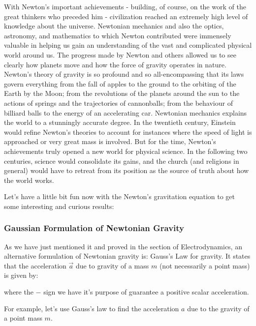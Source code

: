 	With Newton’s important achievements - building, of course, on the work of the great thinkers who preceded him - civilization reached an extremely high level of knowledge about the universe. Newtonian mechanics and also the optics, astronomy, and mathematics to which Newton contributed were immensely valuable in helping us gain an understanding of the vast and complicated physical world around us. The progress made by Newton and others allowed us to see clearly how planets move and how the force of gravity operates in nature. Newton’s theory of gravity is so profound and so all-encompassing that its laws govern everything from the fall of apples to the ground to the orbiting of the Earth by the Moon; from the revolutions of the planets around the sun to the actions of springs and the trajectories of cannonballs; from the behaviour of billiard balls to the energy of an accelerating car. Newtonian mechanics explains the world to a stunningly accurate degree. In the twentieth century, Einstein would refine Newton’s theories to account for instances where the speed of light is approached or very great mass is involved. But for the time, Newton’s achievements truly opened a new world for physical science. In the following two centuries, science would consolidate its gains, and the church (and religions in general) would have to retreat from its position as the source of truth about how the world works.
	
	Let's have a little bit fun now with the Newton's gravitation equation to get some interesting and curious results:
	
	\subsubsection{Gaussian Formulation of Newtonian Gravity}
	As we have just mentioned it and proved in the section of Electrodynamics, an alternative formulation of Newtonian gravity is: Gauss’s Law for gravity. It states that the acceleration $\vec{a}$ due to gravity of a mass $m$ (not necessarily a point mass) is given by:
	
	where the $-$ sign we have it's purpose of guarantee a positive scalar acceleration.
	
	For example, let's use Gauss's law to find the acceleration $a$ due to the gravity of a point mass $m$.

